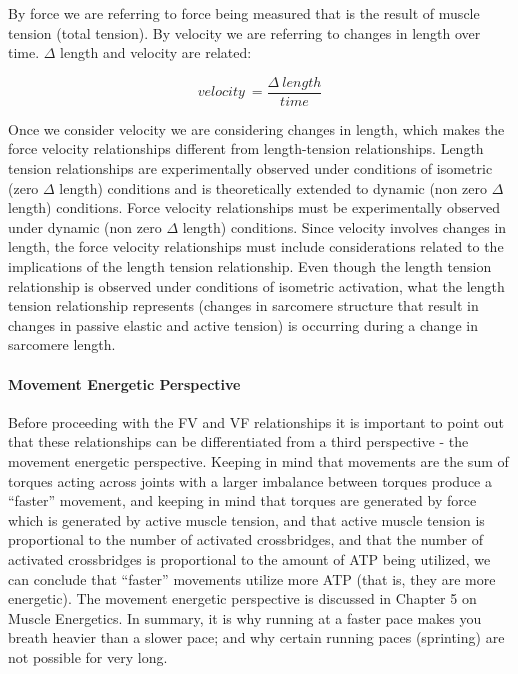 By force we are referring to force being measured that is the result of muscle tension (total tension). By velocity we are referring to changes in length over time. $\Delta$ length and velocity are related: 

\begin{equation} \label{eq_velocity}
velocity \ = \frac{\Delta \ length}{time}
\end{equation}

 Once we consider velocity we are considering changes in length, which makes the force velocity relationships different from length-tension relationships. Length tension relationships are experimentally observed under conditions of isometric (zero $\Delta$ length) conditions and is theoretically extended to dynamic (non zero $\Delta$ length) conditions. Force velocity relationships must be experimentally observed under dynamic (non zero $\Delta$ length) conditions. Since velocity involves changes in length, the force velocity relationships must include considerations related to the implications of the length tension relationship. Even though the length tension relationship is observed under conditions of isometric activation, what the length tension relationship represents (changes in sarcomere structure that result in changes in passive elastic and active tension) is occurring during a change in sarcomere length.

\paragraph{Movement Energetic Perspective}
Before proceeding with the FV and VF relationships it is important to point out that these relationships can be differentiated from a third perspective - the movement energetic perspective. Keeping in mind that movements are the sum of torques acting across joints with a larger imbalance between torques produce a “faster” movement, and keeping in mind that torques are generated by force which is generated by active muscle tension, and that active muscle tension is proportional to the number of activated crossbridges, and that the number of activated crossbridges is proportional to the amount of ATP being utilized, we can conclude that “faster” movements utilize more ATP (that is, they are more energetic). The movement energetic perspective is discussed in Chapter 5 on Muscle Energetics. In summary, it is why running at a faster pace makes you breath heavier than a slower pace; and why certain running paces (sprinting) are not possible for very long. \footnotemark{} 

